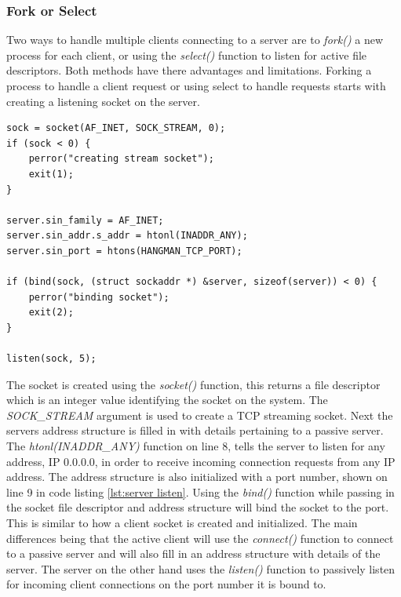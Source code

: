 \documentclass[12pt,a4paper,titlepage]{article}
\begin{document}
\subsubsection{Fork or Select}

Two ways to handle multiple clients connecting to a server are to \textit{fork()} a new process for each client, or using the \textit{select()} function to listen for active file descriptors. Both methods have there advantages and limitations. Forking a process to handle a client request or using select to handle requests starts with creating a listening socket on the server. 

\begin{lstlisting}[caption=Server listen socket implementation \cite{stevensunp},label=lst:server listen]
sock = socket(AF_INET, SOCK_STREAM, 0); 
if (sock < 0) {
	perror("creating stream socket");
	exit(1);
}

server.sin_family = AF_INET;
server.sin_addr.s_addr = htonl(INADDR_ANY);
server.sin_port = htons(HANGMAN_TCP_PORT);

if (bind(sock, (struct sockaddr *) &server, sizeof(server)) < 0) {
	perror("binding socket");
	exit(2);
}

listen(sock, 5);
\end{lstlisting}

The socket is created using the \textit{socket()} function, this returns a file descriptor which is an integer value identifying the socket on the system. The \textit{SOCK\_STREAM} argument is used to create a TCP streaming socket. Next the servers address structure is filled in with details pertaining to a passive server. The \textit{htonl(INADDR\_ANY)} function on line 8, tells the server to listen for any address, IP 0.0.0.0, in order to receive incoming connection requests from any IP address. The address structure is also initialized with a port number, shown on line 9 in code listing \ref{lst:server listen}. Using the \textit{bind()} function while passing in the socket file descriptor and address structure will bind the socket to the port.\\ 

This is similar to how a client socket is created and initialized. The main differences being that the active client will use the \textit{connect()} function to connect to a passive server and will also fill in an address structure with details of the server. The server on the other hand uses the \textit{listen()} function to passively listen for incoming client connections on the port number it is bound to. \\
\end{document}
